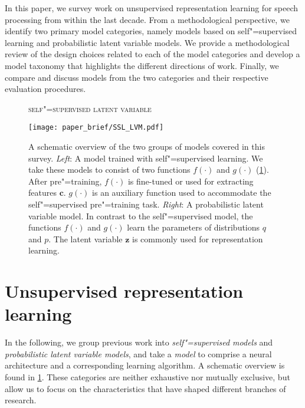 {In this paper, we survey work on unsupervised representation learning for speech processing from within the last decade.
From a methodological perspective, we identify two primary model categories, namely models based on self"=supervised learning and probabilistic latent variable models. 
We provide a methodological review of the design choices related to each of the model categories and develop a model taxonomy that highlights the different directions of work. Finally, we compare and discuss models from the two categories and their respective evaluation procedures.

\begin{figure}
    \begin{flushleft}
        \textsc{\small \hspace{0.16\textwidth} self"=supervised \hspace{0.22\textwidth} latent variable}
    \end{flushleft}
    \centering
    \texttt{[image: paper\_brief/SSL\_LVM.pdf]}
    \caption[ schematic overview of the self"=supervised and probabilistic latent variable models covered in this survey.]{A schematic overview of the two groups of models covered in this survey. \textit{Left}: A model trained with self"=supervised learning. We take these models to consist of two functions $f(\cdot)$ and $g(\cdot)$ (\cref{ssec:notation}). After pre"=training, $f(\cdot)$ is fine-tuned or used for extracting features $\mathbf{c}$. $g(\cdot)$ is an auxiliary function used to accommodate the self"=supervised pre"=training task. \textit{Right}: A probabilistic latent variable model. In contrast to the self"=supervised model, the functions $f(\cdot)$ and $g(\cdot)$ learn the parameters of distributions $q$ and $p$. The latent variable $\mathbf{z}$ is commonly used for representation learning.}
    \label{fig:ssl_lvm}
\end{figure}

\section{Unsupervised representation learning}\label{ssec:notation}

In the following, we group previous work into \textit{self"=supervised models} and \textit{probabilistic latent variable models}, and take a \emph{model} to comprise a neural architecture and a corresponding learning algorithm. A schematic overview is found in \cref{fig:ssl_lvm}. These categories are neither exhaustive nor mutually exclusive, but allow us to focus on the characteristics that have shaped different branches of research. 

}
